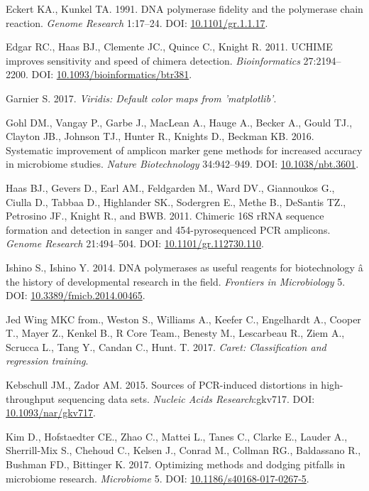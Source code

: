 \documentclass[11pt,]{article}
\begin{document}
\hypertarget{ref-Eckert1991}{}
Eckert KA., Kunkel TA. 1991. DNA polymerase fidelity and the polymerase
chain reaction. \emph{Genome Research} 1:17--24. DOI:
\href{https://doi.org/10.1101/gr.1.1.17}{10.1101/gr.1.1.17}.

\hypertarget{ref-uchime_Edgar_2011}{}
Edgar RC., Haas BJ., Clemente JC., Quince C., Knight R. 2011. UCHIME
improves sensitivity and speed of chimera detection.
\emph{Bioinformatics} 27:2194--2200. DOI:
\href{https://doi.org/10.1093/bioinformatics/btr381}{10.1093/bioinformatics/btr381}.

\hypertarget{ref-viridis_citation_2017}{}
Garnier S. 2017. \emph{Viridis: Default color maps from 'matplotlib'}.

\hypertarget{ref-taq_Gohl_2016}{}
Gohl DM., Vangay P., Garbe J., MacLean A., Hauge A., Becker A., Gould
TJ., Clayton JB., Johnson TJ., Hunter R., Knights D., Beckman KB. 2016.
Systematic improvement of amplicon marker gene methods for increased
accuracy in microbiome studies. \emph{Nature Biotechnology} 34:942--949.
DOI: \href{https://doi.org/10.1038/nbt.3601}{10.1038/nbt.3601}.

\hypertarget{ref-Haas2011}{}
Haas BJ., Gevers D., Earl AM., Feldgarden M., Ward DV., Giannoukos G.,
Ciulla D., Tabbaa D., Highlander SK., Sodergren E., Methe B., DeSantis
TZ., Petrosino JF., Knight R., and BWB. 2011. Chimeric 16S rRNA sequence
formation and detection in sanger and 454-pyrosequenced PCR amplicons.
\emph{Genome Research} 21:494--504. DOI:
\href{https://doi.org/10.1101/gr.112730.110}{10.1101/gr.112730.110}.

\hypertarget{ref-polymerase_Ishino_2014}{}
Ishino S., Ishino Y. 2014. DNA polymerases as useful reagents for
biotechnology â the history of developmental research in the field.
\emph{Frontiers in Microbiology} 5. DOI:
\href{https://doi.org/10.3389/fmicb.2014.00465}{10.3389/fmicb.2014.00465}.

\hypertarget{ref-caret_citation}{}
Jed Wing MKC from., Weston S., Williams A., Keefer C., Engelhardt A.,
Cooper T., Mayer Z., Kenkel B., R Core Team., Benesty M., Lescarbeau R.,
Ziem A., Scrucca L., Tang Y., Candan C., Hunt. T. 2017. \emph{Caret:
Classification and regression training}.

\hypertarget{ref-Kebschull2015}{}
Kebschull JM., Zador AM. 2015. Sources of PCR-induced distortions in
high-throughput sequencing data sets. \emph{Nucleic Acids
Research}:gkv717. DOI:
\href{https://doi.org/10.1093/nar/gkv717}{10.1093/nar/gkv717}.

\hypertarget{ref-review_Kim_2017}{}
Kim D., Hofstaedter CE., Zhao C., Mattei L., Tanes C., Clarke E., Lauder
A., Sherrill-Mix S., Chehoud C., Kelsen J., Conrad M., Collman RG.,
Baldassano R., Bushman FD., Bittinger K. 2017. Optimizing methods and
dodging pitfalls in microbiome research. \emph{Microbiome} 5. DOI:
\href{https://doi.org/10.1186/s40168-017-0267-5}{10.1186/s40168-017-0267-5}.
\end{document}

